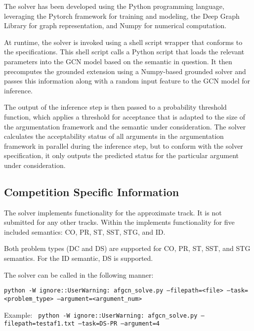 \documentclass[conference]{IEEEtran}
\begin{document}
The solver has been developed using the Python programming language, leveraging the Pytorch framework for training and modeling, the Deep Graph Library for graph representation, and Numpy for numerical computation.

At runtime, the solver is invoked using a shell script wrapper that conforms to the specifications. This shell script calls a Python script that loads the relevant parameters into the GCN model based on the semantic in question. It then precomputes the grounded extension using a Numpy-based grounded solver and passes this information along with a random input feature to the GCN model for inference.

The output of the inference step is then passed to a probability threshold function, which applies a threshold for acceptance that is adapted to the size of the argumentation framework and the semantic under consideration. The solver calculates the acceptability status of all arguments in the argumentation framework in parallel during the inference step, but to conform with the solver specification, it only outputs the predicted status for the particular argument under consideration.

\subsection{Competition Specific Information}
The solver implements functionality for the approximate track. It is not submitted for any other tracks.
Within the implements functionality for five included semantics: CO, PR, ST, SST, STG, and ID.

Both problem types (DC and DS) are supported for CO, PR, ST, SST, and STG
semantics. For the ID semantic, DS is supported.

The solver can be called in the following manner:

\texttt{python -W ignore::UserWarning: afgcn\_solve.py --filepath=<file> --task=<problem\_type> --argument=<argument\_num>}

Example:
\texttt{
python -W ignore::UserWarning: afgcn\_solve.py --filepath=testaf1.txt --task=DS-PR --argument=4}

 
\end{document}
